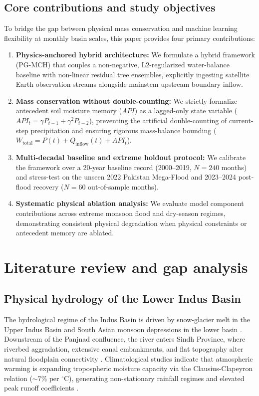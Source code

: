 \documentclass[11pt,a4paper,fleqn]{article}
\begin{document}
\subsection{Core contributions and study objectives}
To bridge the gap between physical mass conservation and machine learning flexibility at monthly basin scales, this paper provides four primary contributions:
\begin{enumerate}
    \item \textbf{Physics-anchored hybrid architecture:} We formulate a hybrid framework (PG-MCH) that couples a non-negative, L2-regularized water-balance baseline with non-linear residual tree ensembles, explicitly ingesting satellite Earth observation streams alongside mainstem upstream boundary inflow.
    \item \textbf{Mass conservation without double-counting:} We strictly formalize antecedent soil moisture memory ($API$) as a lagged-only state variable ($API_t = \gamma P_{t-1} + \gamma^2 P_{t-2}$), preventing the artificial double-counting of current-step precipitation and ensuring rigorous mass-balance bounding ($W_{\text{total}} = P(t) + Q_{\text{inflow}}(t) + API_t$).
    \item \textbf{Multi-decadal baseline and extreme holdout protocol:} We calibrate the framework over a 20-year baseline record (2000--2019, $N=240$ months) and stress-test on the unseen 2022 Pakistan Mega-Flood and 2023--2024 post-flood recovery ($N=60$ out-of-sample months).
    \item \textbf{Systematic physical ablation analysis:} We evaluate model component contributions across extreme monsoon flood and dry-season regimes, demonstrating consistent physical degradation when physical constraints or antecedent memory are ablated.
\end{enumerate}

\section{Literature review and gap analysis}

\subsection{Physical hydrology of the Lower Indus Basin}
The hydrological regime of the Indus Basin is driven by snow-glacier melt in the Upper Indus Basin and South Asian monsoon depressions in the lower basin \citep{biemans2016future, immerzeel2020importance, syed2022analysis}. Downstream of the Panjnad confluence, the river enters Sindh Province, where riverbed aggradation, extensive canal embankments, and flat topography alter natural floodplain connectivity \citep{hashmi2022hydrodynamic, inam2007geographic}. Climatological studies indicate that atmospheric warming is expanding tropospheric moisture capacity via the Clausius-Clapeyron relation ($\sim 7\%\text{ per }^\circ\text{C}$), generating non-stationary rainfall regimes and elevated peak runoff coefficients \citep{nanditha20232022, wwa2022pakistan}.
\end{document}
